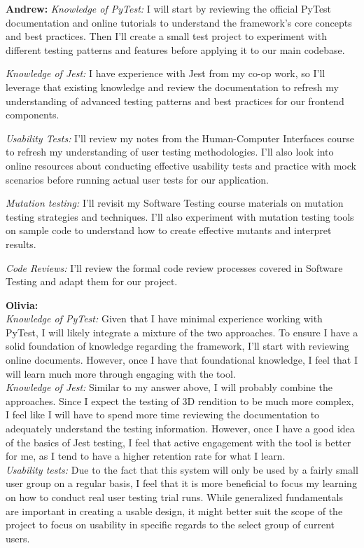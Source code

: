 \documentclass[12pt, titlepage]{article}
\begin{document}
\begin{enumerate}
  \textbf{Andrew: }
  \textit{Knowledge of PyTest:} I will start by reviewing the official PyTest documentation and online tutorials to understand the framework's core concepts and best practices. Then I'll create a small test project to experiment with different testing patterns and features before applying it to our main codebase.
  
  \textit{Knowledge of Jest:} I have experience with Jest from my co-op work, so I'll leverage that existing knowledge and review the documentation to refresh my understanding of advanced testing patterns and best practices for our frontend components.
  
  \textit{Usability Tests:} I'll review my notes from the Human-Computer Interfaces course to refresh my understanding of user testing methodologies. I'll also look into online resources about conducting effective usability tests and practice with mock scenarios before running actual user tests for our application.
  
  \textit{Mutation testing:} I'll revisit my Software Testing course materials on mutation testing strategies and techniques. I'll also experiment with mutation testing tools on sample code to understand how to create effective mutants and interpret results.
  
  \textit{Code Reviews:} I'll review the formal code review processes covered in Software Testing and adapt them for our project. 

  \textbf{Olivia: }\\
  \textit{Knowledge of PyTest:} Given that I have minimal experience working with PyTest, I will likely integrate a mixture of the two approaches. To ensure I have a solid foundation of knowledge regarding the framework, I’ll start with reviewing online documents. However, once I have that foundational knowledge, I feel that I will learn much more through engaging with the tool.\\

  \textit{Knowledge of Jest:} Similar to my answer above, I will probably combine the approaches. Since I expect the testing of 3D rendition to be much more complex, I feel like I will have to spend more time reviewing the documentation to adequately understand the testing information. However, once I have a good idea of the basics of Jest testing, I feel that active engagement with the tool is better for me, as I tend to have a higher retention rate for what I learn.\\

  \textit{Usability tests:} Due to the fact that this system will only be used by a fairly small user group on a regular basis, I feel that it is more beneficial to focus my learning on how to conduct real user testing trial runs. While generalized fundamentals are important in creating a usable design, it might better suit the scope of the project to focus on usability in specific regards to the select group of current users.\\


\end{enumerate}
\end{document}
